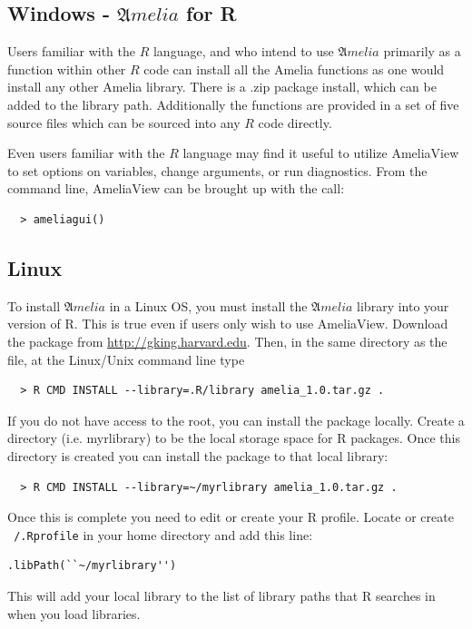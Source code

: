 \documentclass[12pt,titlepage]{article}
\newcommand{\Amelia}{\ensuremath{\mathfrak Amelia} }
\begin{document}
\subsection{Windows - \Amelia for R}

Users familiar with the $R$ language, and who intend to use \Amelia
primarily as a function within other $R$ code can install all the
Amelia functions as one would install any other Amelia library.  There
is a .zip package install, which can be added to the library path.
Additionally the functions are provided in a set of five source files
which can be sourced into any $R$ code directly.

Even users familiar with the $R$ language may find it useful to
utilize AmeliaView to set options on variables, change arguments, or
run diagnostics.  From the command line, AmeliaView can be brought up
with the call:
  \begin{verbatim}
  > ameliagui()
  \end{verbatim}

\subsection{Linux}
\label{sec:lin-install}
To install ${\mathfrak Amelia}$ in a Linux OS, you must install the
${\mathfrak Amelia}$ library into your version of R.  This is true
even if users only wish to use AmeliaView.  Download the package from
\url{http://gking.harvard.edu}.  Then, in the same directory as the
file, at the Linux/Unix command line type
  \begin{verbatim}
  > R CMD INSTALL --library=.R/library amelia_1.0.tar.gz .
  \end{verbatim}
If you do not have access to the root, you can install the package
locally.  Create a directory (i.e. myrlibrary) to be the local storage
space for R packages.  Once this directory is created you can install
the package to that local library:
  \begin{verbatim}
  > R CMD INSTALL --library=~/myrlibrary amelia_1.0.tar.gz .
  \end{verbatim}
Once this is complete you need to edit or create your R profile.
Locate or create \texttt{~/.Rprofile} in your home directory and add
this line:
\begin{verbatim}
.libPath(``~/myrlibrary'')
\end{verbatim}
This will add your local library to the list of library paths that R
searches in when you load libraries.
\end{document}
